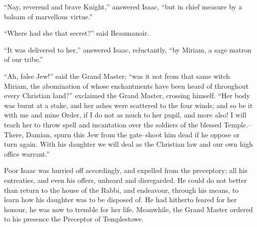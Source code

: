 ``Nay, reverend and brave Knight,'' answered Isaac, ``but in chief
measure by a balsam of marvellous virtue.''

``Where had she that secret?'' said Beaumanoir.

``It was delivered to her,'' answered Isaac, reluctantly, ``by Miriam, a
sage matron of our tribe.''

``Ah, false Jew!'' said the Grand Master; ``was it not from that same
witch Miriam, the abomination of whose enchantments have been heard of
throughout every Christian land?'' exclaimed the Grand Master, crossing
himself. ``Her body was burnt at a stake, and her ashes were scattered
to the four winds; and so be it with me and mine Order, if I do not as
much to her pupil, and more also! I will teach her to throw spell and
incantation over the soldiers of the blessed Temple.--There, Damian,
spurn this Jew from the gate--shoot him dead if he oppose or turn again.
With his daughter we will deal as the Christian law and our own high
office warrant.''

Poor Isaac was hurried off accordingly, and expelled from the
preceptory; all his entreaties, and even his offers, unheard and
disregarded. He could do not better than return to the house of the
Rabbi, and endeavour, through his means, to learn how his daughter was
to be disposed of. He had hitherto feared for her honour, he was now to
tremble for her life. Meanwhile, the Grand Master ordered to his
presence the Preceptor of Templestowe.
